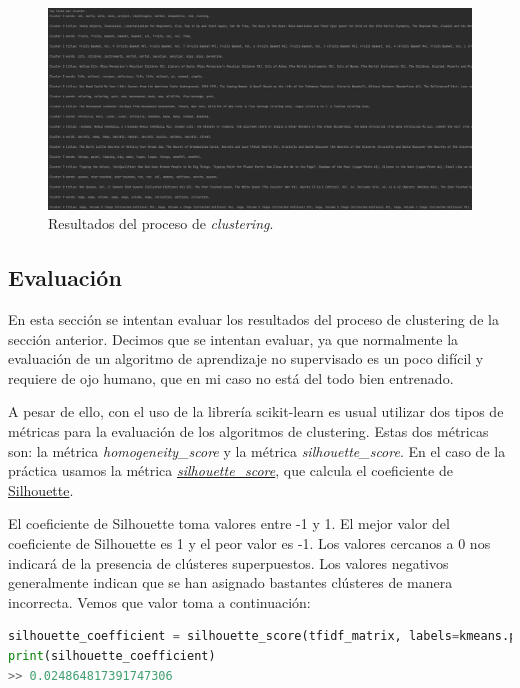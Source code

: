 \documentclass{uimppracticas}
\begin{document}
\begin{figure}[h]
	\centering
	\includegraphics[scale=0.35]{images/results}
	\caption{Resultados del proceso de \textit{clustering}.}
	\label{results}
\end{figure}

\subsection{Evaluación}

En esta sección se intentan evaluar los resultados del proceso de clustering de la sección anterior. Decimos que se intentan evaluar, ya que normalmente la evaluación de un algoritmo de aprendizaje no supervisado es un poco difícil y requiere de ojo humano, que en mi caso no está del todo bien entrenado.

A pesar de ello, con el uso de la librería scikit-learn es usual utilizar dos tipos de métricas para la evaluación de los algoritmos de clustering. Estas dos métricas son: la métrica \textit{homogeneity\_score} y la métrica \textit{silhouette\_score}. En el caso de la práctica usamos la métrica \href{https://scikit-learn.org/stable/modules/generated/sklearn.metrics.silhouette_score.html}{\textit{silhouette\_score}}, que calcula el coeficiente de \href{https://es.wikipedia.org/wiki/Silhouette_(clustering)}{Silhouette}.

El coeficiente de Silhouette toma valores entre -1 y 1. El mejor valor del coeficiente de Silhouette es 1 y el peor valor es -1. Los valores cercanos a 0 nos indicará de la presencia de clústeres superpuestos. Los valores negativos generalmente indican que se han asignado bastantes clústeres de manera incorrecta. Vemos que valor toma a continuación:

\begin{lstlisting}[language=python]
silhouette_coefficient = silhouette_score(tfidf_matrix, labels=kmeans.predict(tfidf_matrix))
print(silhouette_coefficient)
>> 0.024864817391747306
\end{lstlisting}
\end{document}
